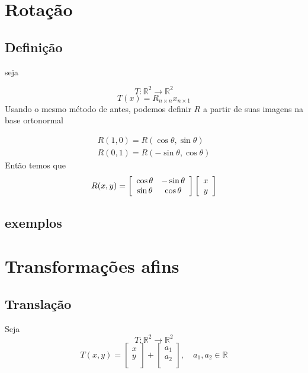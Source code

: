 \documentclass[12pt]{report}
\theoremstyle{definition}
\begin{document}
\section{Rotação}
\subsection{Definição}
seja

\[
    T: \mathbb{R}^2 \longrightarrow \mathbb{R}^2
\]
\[
    T(x) = R_{n \times n}x_{n \times 1}
\]
Usando o mesmo método de antes, podemos definir \(R\) a partir de suas imagens na base ortonormal

\begin{gather*}
    R(1,0) = R(\cos{\theta}, \sin{\theta})\\
    R(0,1) = R( - \sin{\theta}, \cos{\theta})
\end{gather*}
Então temos que
\begin{equation}
    R(x, y) = 
    \left[ 
    {
        \begin{array}{c c}
            \cos{\theta} & -\sin{\theta} \\
            \sin{\theta} &  \cos{\theta} \\
        \end{array} 
    } 
    \right]
    \left[ 
    {
        \begin{array}{c}
            x \\
            y \\
        \end{array} 
        } 
    \right]
\end{equation}

\subsection{exemplos}

\section{Transformações afins}

\subsection{Translação}
Seja
\[
    T: \mathbb{R}^2 \longrightarrow \mathbb{R}^2
\]
\begin{equation}
    T(x, y) = 
    \left[ 
    {
        \begin{array}{c}
            x \\
            y \\
        \end{array} 
        } 
    \right]
    +
    \left[ 
    {
        \begin{array}{c}
            a_1 \\ 
            a_2 \\
        \end{array} 
    } 
    \right]
    ,\quad a_1, a_2 \in \mathbb{R}
\end{equation}
\end{document}
